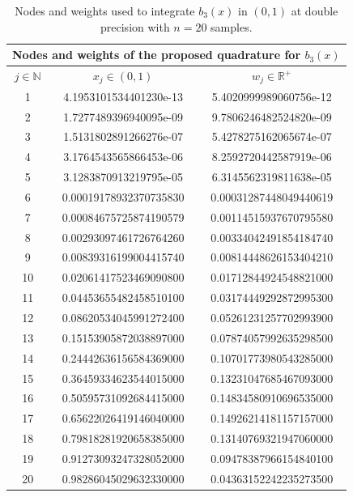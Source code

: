 \documentclass[a4paper, twosided]{book}
\begin{document}
\newpage
\begin{table}[H]
\centering
\begin{tabular}{|c||c|c|}
\hline
\multicolumn{3}{|c|}{\textbf{Nodes and weights of the proposed quadrature for $b_3(x)$}} \\
\hline
$j\in\mathbb{N}$ & $x_j\in(0,1)$ & $w_j\in\mathbb{R}^+$ \\
\hline
1   &  4.1953101534401230e-13   &  5.4020999989060756e-12  \\
2   &  1.7277489396940095e-09   &  9.7806246482524820e-09  \\
3   &  1.5131802891266276e-07   &  5.4278275162065674e-07  \\
4   &  3.1764543565866453e-06   &  8.2592720442587919e-06  \\
5   &  3.1283870913219795e-05   &  6.3145562319811638e-05  \\
6   &  0.00019178932370735830   &  0.00031287448049440619  \\
7   &  0.00084675725874190579   &  0.00114515937670795580  \\
8   &  0.00293097461726764260   &  0.00334042491854184740  \\
9   &  0.00839316199004415740   &  0.00814448626153404210  \\
10  &  0.02061417523469090800   &  0.01712844924548821000  \\
11  &  0.04453655482458510100   &  0.03174449292872995300  \\
12  &  0.08620534045991272400   &  0.05261231257702993900  \\
13  &  0.15153905872038897000   &  0.07874057992635298500  \\
14  &  0.24442636156584369000   &  0.10701773980543285000  \\
15  &  0.36459334623544015000   &  0.13231047685467093000  \\
16  &  0.50595731092684415000   &  0.14834580910696535000  \\
17  &  0.65622026419146040000   &  0.14926214181157157000  \\
18  &  0.79818281920658385000   &  0.13140769321947060000  \\
19  &  0.91273093247328052000   &  0.09478387966154840100  \\
20  &  0.98286045029632330000   &  0.04363152242235273500  \\
\hline
\end{tabular}
  \caption{Nodes and weights used to integrate $b_3(x)$ in $(0,1)$ at double precision with $n=20$ samples.}
  \label{table2.7}
\end{table}
\end{document}
